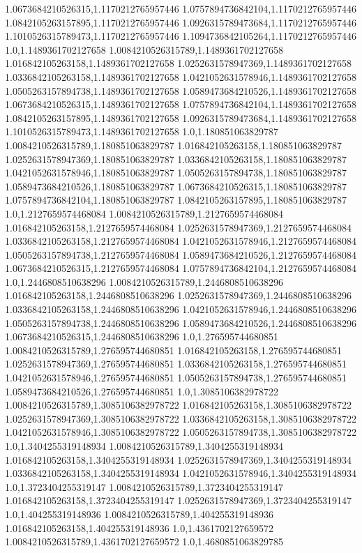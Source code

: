1.0673684210526315,1.1170212765957446
1.0757894736842104,1.1170212765957446
1.0842105263157895,1.1170212765957446
1.0926315789473684,1.1170212765957446
1.1010526315789473,1.1170212765957446
1.1094736842105264,1.1170212765957446
1.0,1.1489361702127658
1.0084210526315789,1.1489361702127658
1.016842105263158,1.1489361702127658
1.0252631578947369,1.1489361702127658
1.0336842105263158,1.1489361702127658
1.0421052631578946,1.1489361702127658
1.0505263157894738,1.1489361702127658
1.0589473684210526,1.1489361702127658
1.0673684210526315,1.1489361702127658
1.0757894736842104,1.1489361702127658
1.0842105263157895,1.1489361702127658
1.0926315789473684,1.1489361702127658
1.1010526315789473,1.1489361702127658
1.0,1.180851063829787
1.0084210526315789,1.180851063829787
1.016842105263158,1.180851063829787
1.0252631578947369,1.180851063829787
1.0336842105263158,1.180851063829787
1.0421052631578946,1.180851063829787
1.0505263157894738,1.180851063829787
1.0589473684210526,1.180851063829787
1.0673684210526315,1.180851063829787
1.0757894736842104,1.180851063829787
1.0842105263157895,1.180851063829787
1.0,1.2127659574468084
1.0084210526315789,1.2127659574468084
1.016842105263158,1.2127659574468084
1.0252631578947369,1.2127659574468084
1.0336842105263158,1.2127659574468084
1.0421052631578946,1.2127659574468084
1.0505263157894738,1.2127659574468084
1.0589473684210526,1.2127659574468084
1.0673684210526315,1.2127659574468084
1.0757894736842104,1.2127659574468084
1.0,1.2446808510638296
1.0084210526315789,1.2446808510638296
1.016842105263158,1.2446808510638296
1.0252631578947369,1.2446808510638296
1.0336842105263158,1.2446808510638296
1.0421052631578946,1.2446808510638296
1.0505263157894738,1.2446808510638296
1.0589473684210526,1.2446808510638296
1.0673684210526315,1.2446808510638296
1.0,1.276595744680851
1.0084210526315789,1.276595744680851
1.016842105263158,1.276595744680851
1.0252631578947369,1.276595744680851
1.0336842105263158,1.276595744680851
1.0421052631578946,1.276595744680851
1.0505263157894738,1.276595744680851
1.0589473684210526,1.276595744680851
1.0,1.3085106382978722
1.0084210526315789,1.3085106382978722
1.016842105263158,1.3085106382978722
1.0252631578947369,1.3085106382978722
1.0336842105263158,1.3085106382978722
1.0421052631578946,1.3085106382978722
1.0505263157894738,1.3085106382978722
1.0,1.3404255319148934
1.0084210526315789,1.3404255319148934
1.016842105263158,1.3404255319148934
1.0252631578947369,1.3404255319148934
1.0336842105263158,1.3404255319148934
1.0421052631578946,1.3404255319148934
1.0,1.3723404255319147
1.0084210526315789,1.3723404255319147
1.016842105263158,1.3723404255319147
1.0252631578947369,1.3723404255319147
1.0,1.404255319148936
1.0084210526315789,1.404255319148936
1.016842105263158,1.404255319148936
1.0,1.4361702127659572
1.0084210526315789,1.4361702127659572
1.0,1.4680851063829785
